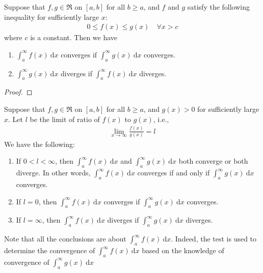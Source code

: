 \documentclass[thmcnt=section, 12pt]{elegantbook}
\begin{document}

\begin{theorem} \label{thm:25}
    Suppose that $f, g \in \mathfrak{R}$ on $[a, b]$ for all $b \geq a$, and $f$ and $g$ satisfy the following inequality for sufficiently large $x$:
    \begin{align*}
        0 \leq f(x) \leq g(x)
        \quad \forall x > c
    \end{align*}
    where $c$ is a constant. Then we have 
    \begin{enumerate}
        \item $\int_a^\infty f(x) \ \mathrm{d}x$ converges if $\int_a^\infty g(x) \ \mathrm{d}x$ converges.
        \item $\int_a^\infty g(x) \ \mathrm{d}x$ diverges if $\int_a^\infty f(x) \ \mathrm{d}x$ diverges.
    \end{enumerate}
\end{theorem}

\begin{proof}
\end{proof}


\begin{theorem}
    Suppose that $f, g \in \mathfrak{R}$ on $[a, b]$ for all $b \geq a$, and $g(x) > 0$ for sufficiently large $x$. Let $l$ be the limit of ratio of $f(x)$ to $g(x)$, i.e., 
    \begin{align*}
        \lim_{x \to \infty} \frac{f(x)}{g(x)} = l
    \end{align*}
    We have the following:
    \begin{enumerate}
        \item If $0 < l < \infty$, then $\int_a^\infty f(x) \ \mathrm{d}x$ and $\int_a^\infty g(x) \ \mathrm{d}x$ both converge or both diverge. In other words, $\int_a^\infty f(x) \ \mathrm{d}x$ converges if and only if $\int_a^\infty g(x) \ \mathrm{d}x$ converges.
        \item If $l = 0$, then $\int_a^\infty f(x) \ \mathrm{d}x$ converges if $\int_a^\infty g(x) \ \mathrm{d}x$ converges.
        \item If $l = \infty$, then $\int_a^\infty f(x) \ \mathrm{d}x$ diverges if $\int_a^\infty g(x) \ \mathrm{d}x$ diverges.
    \end{enumerate}
\end{theorem}

\begin{remark}
    Note that all the conclusions are about $\int_a^\infty f(x) \ \mathrm{d}x$. Indeed, the test is used to determine the convergence of $\int_a^\infty f(x) \ \mathrm{d}x$ based on the knowledge of convergence of $\int_a^\infty g(x) \ \mathrm{d}x$
\end{remark}
\end{document}
